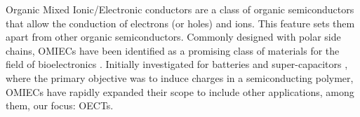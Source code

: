 Organic Mixed Ionic/Electronic conductors are a class of organic semiconductors that allow the conduction of electrons (or holes) and ions. This feature sets them apart from other organic semiconductors. %
Commonly designed with polar side chains, OMIECs have been identified as a promising class of materials for the field of bioelectronics
\cite{giovannittiEnergeticControlRedoxActive2020}. Initially investigated for batteries and super-capacitors \cite{snookConductingpolymerbasedSupercapacitorDevices2011}
\cite{liangOrganicElectrodeMaterials2012}, where the primary objective was to induce charges in a semiconducting polymer, OMIECs have rapidly expanded their scope to include other applications, among them, our focus: OECTs.

